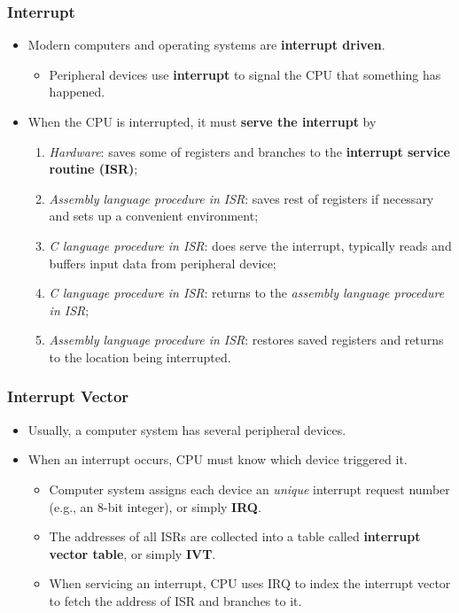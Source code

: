 \documentclass[CJKutf8,xcolor=pdftex,dvipsnames,table]{beamer}
\begin{document}
\begin{CJK*}{UTF8}{song}
  \begin{frame}
    \frametitle{Interrupt} \pause
    \begin{itemize}
    \item{Modern computers and operating systems are \textbf{interrupt driven}.} \pause
      \begin{itemize}
      \item{Peripheral devices use \textbf{interrupt} to signal the CPU that something has happened.} \pause
      \end{itemize}
    \item{When the CPU is interrupted, it must \textbf{serve the interrupt} by} \pause
      \begin{enumerate}
      \item{\emph{Hardware}: saves some of registers and branches to the \textbf{interrupt service routine (ISR)};} \pause
      \item{\emph{Assembly language procedure in ISR}: saves rest of registers if necessary and sets up a convenient environment;} \pause
      \item{\emph{C language procedure in ISR}: does serve the interrupt, typically reads and buffers input data from peripheral device;} \pause
      \item{\emph{C language procedure in ISR}: returns to the \emph{assembly language procedure in ISR};} \pause
      \item{\emph{Assembly language procedure in ISR}: restores saved registers and returns to the location being interrupted. }
      \end{enumerate}
    \end{itemize}
  \end{frame}

  \begin{frame}
    \frametitle{Interrupt Vector} \pause
    \begin{itemize}
    \item{Usually, a computer system has several peripheral devices.} \pause
    \item{When an interrupt occurs, CPU must know which device triggered it.} \pause
      \begin{itemize}
      \item{Computer system assigns each device an \emph{unique} interrupt request number (e.g., an 8-bit integer), or simply \textbf{IRQ}.} \pause
      \item{The addresses of all ISRs are collected into a table called \textbf{interrupt vector table}, or simply \textbf{IVT}.} \pause
      \item{When servicing an interrupt, CPU uses IRQ to index the interrupt vector to fetch the address of ISR and branches to it.}
      \end{itemize}
    \end{itemize}
  \end{frame}


\end{CJK*}
\end{document}
